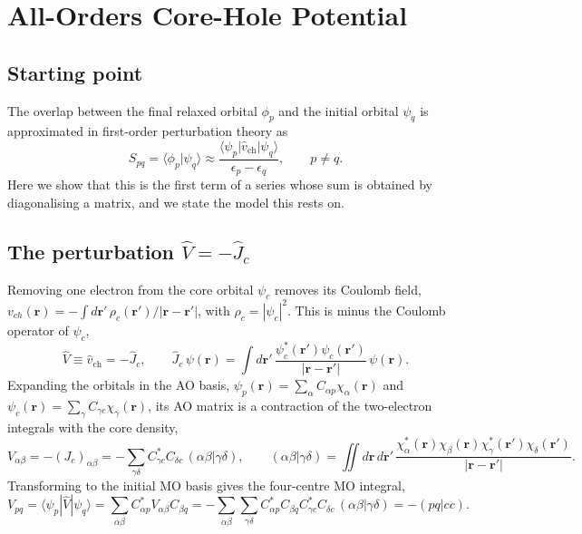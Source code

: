 \documentclass[11pt]{article}
\begin{document}
\section*{All-Orders Core-Hole Potential}

\subsection*{Starting point}

The overlap between the final relaxed orbital $\phi_p$ and the initial orbital $\psi_q$ is approximated in first-order perturbation theory as
\begin{equation}
  S_{pq} = \langle\phi_p|\psi_q \rangle \approx
      \frac{\langle\psi_p|\hat{v}_{\mathrm{ch}}|\psi_q\rangle}{\epsilon_p - \epsilon_q},
      \qquad p \neq q .
  \label{eq:first_order}
\end{equation}
Here we show that this is the first term of a series whose sum is obtained by diagonalising a matrix, and we state the model this rests on.

\subsection*{The perturbation $\hat{V} = -\hat{J}_c$}

Removing one electron from the core orbital $\psi_c$ removes its Coulomb field,
$v_{ch}(\mathbf r) = -\int d\mathbf r'\, \rho_c(\mathbf r')/|\mathbf r-\mathbf r'|$, with $\rho_c = |\psi_c|^2$. This is minus the Coulomb operator of $\psi_c$,
\begin{equation}
  \hat{V} \equiv \hat{v}_{\mathrm{ch}} = -\hat{J}_c, \qquad
  \hat{J}_c\, \psi(\mathbf r) = \int d\mathbf r'\, \frac{\psi_c^*(\mathbf r')\psi_c(\mathbf r')}{|\mathbf r-\mathbf r'|}\, \psi(\mathbf r).
\end{equation}
Expanding the orbitals in the AO basis, $\psi_p(\mathbf r) = \sum_{\alpha} C_{\alpha p} \chi_\alpha(\mathbf r)$ and $\psi_c(\mathbf r) = \sum_{\gamma} C_{\gamma c}\chi_\gamma(\mathbf r)$, its AO matrix is a contraction of the two-electron integrals with the core density,
\begin{equation}
  V_{\alpha\beta} = -(J_c)_{\alpha\beta}
  = -\sum_{\gamma\delta} C_{\gamma c}^{*} C_{\delta c}\, (\alpha\beta|\gamma\delta),
  \qquad
  (\alpha\beta|\gamma\delta)
  = \iint d\mathbf r\,d\mathbf r'\,
  \frac{\chi_\alpha^*(\mathbf r)\chi_\beta(\mathbf r)\chi_\gamma^*(\mathbf r')\chi_\delta(\mathbf r')}{|\mathbf r-\mathbf r'|}.
\end{equation}
Transforming to the initial MO basis gives the four-centre MO integral,
\begin{equation}
  V_{pq} = \langle \psi_p|\hat{V}|\psi_q\rangle
  = \sum_{\alpha\beta} C_{\alpha p}^{*} V_{\alpha\beta} C_{\beta q}
  = -\sum_{\alpha\beta}\sum_{\gamma\delta}
  C_{\alpha p}^{*} C_{\beta q} C_{\gamma c}^{*} C_{\delta c}\, (\alpha\beta|\gamma\delta)
  = -(pq|cc).
\end{equation}
\end{document}
